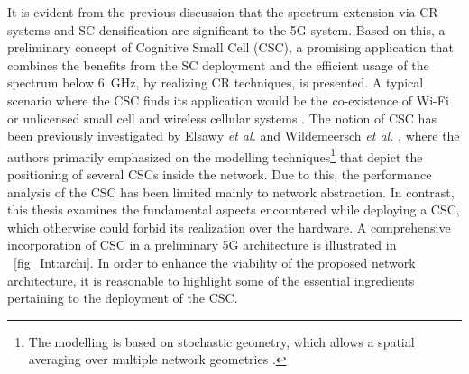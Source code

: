 It is evident from the previous discussion that the spectrum extension via CR systems and SC densification are significant to the 5G system. %
Based on this, a preliminary concept of Cognitive Small Cell (CSC), a promising application that combines the benefits from the SC deployment and the efficient usage of the spectrum below \SI{6}{GHz}, by realizing CR techniques, is presented. A typical scenario where the CSC finds its application would be the co-existence of Wi-Fi or unlicensed small cell and wireless cellular systems \cite{Benn13, Gali15}. The notion of CSC has been previously investigated by Elsawy \textit{et al.} \cite{Elsawy13, Elsawy13_cmag} and Wildemeersch \textit{et al.} \cite{Wild13}, where the authors primarily emphasized on the modelling techniques\footnote{The modelling is based on stochastic geometry, which allows a spatial averaging over multiple network geometries \cite{Haenggi, Haenggi08now}.} that depict the positioning of several CSCs inside the network. Due to this, the performance analysis of the CSC has been limited mainly to network abstraction. In contrast, this thesis examines the fundamental aspects encountered while deploying a CSC, which otherwise could forbid its realization over the hardware. %
 A comprehensive incorporation of CSC in a preliminary 5G architecture is illustrated in \figurename~\ref{fig_Int:archi}. In order to enhance the viability of the proposed network architecture, it is reasonable to highlight some of the essential ingredients pertaining to the deployment of the CSC.

